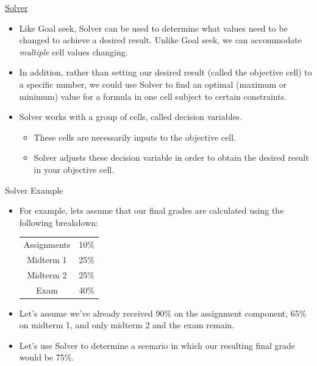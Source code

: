 \documentclass[xcolor=svgnames, handout]{beamer}
\begin{document}
\begin{frame}{\href{https://support.office.com/en-us/article/define-and-solve-a-problem-by-using-solver-5d1a388f-079d-43ac-a7eb-f63e45925040}{Solver}}
\begin{itemize}
\item Like Goal seek, Solver can be used to determine what values need to be changed to achieve a desired result.  Unlike Goal seek, we can accommodate \textit{multiple} cell values changing.
\medskip
\item In addition, rather than setting our desired result (called the objective cell) to a specific number, we could use Solver to find an optimal (maximum or minimum) value for a formula in one cell subject to certain constraints. 
\medskip
\item Solver works with a group of cells, called decision variables.
\begin{itemize}
\item These cells are necessarily inputs to the objective cell.
\item Solver adjusts these decision variable in order to obtain the desired result in your objective cell.
\end{itemize}

\end{itemize}

\end{frame}


\begin{frame}{Solver Example}
\begin{itemize}
\item For example, lets assume that our final grades are calculated using the following breakdown:
\begin{table}[htdp]
\begin{center}
\begin{tabular}{|c|c|}
\hline
Assignments&10\%\\
Midterm 1& 25\%\\
Midterm 2& 25\%\\
Exam & 40\%\\
\hline
\end{tabular}
\end{center}
\label{default}
\end{table}%
\item Let's assume we've already received 90\% on the assignment component, 65\% on midterm 1, and only midterm 2 and the  exam remain.
\medskip
\item Let's use Solver to determine a scenario in which our resulting final grade would be 75\%.
\medskip
\end{itemize}
\end{frame}
\end{document}
